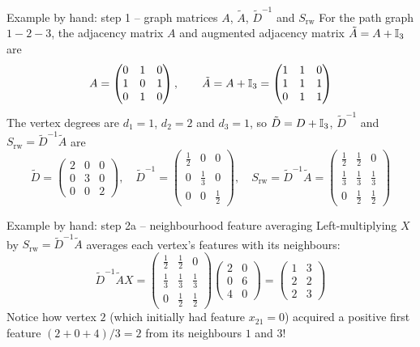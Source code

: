 \documentclass[aspectratio=169]{beamer}\usepackage[]{graphicx}\usepackage[]{xcolor}
\begin{document}
\begin{frame}{Example by hand: step 1 -- graph matrices $A$, $\tilde{A}$, $\tilde{D}^{-1}$ and $S_{\text{rw}}$}
For the path graph $1 - 2 - 3$, the adjacency matrix $A$ and augmented adjacency matrix $\tilde{A} = A + \mathbb{I}_3$ are
\[
A = \begin{pmatrix} 0 & 1 & 0 \\ 1 & 0 & 1 \\ 0 & 1 & 0 \end{pmatrix}, \qquad
\tilde{A} = A + \mathbb{I}_3 = \begin{pmatrix} 1 & 1 & 0 \\ 1 & 1 & 1 \\ 0 & 1 & 1 \end{pmatrix}
\]
\vfill
The vertex degrees are $d_1 = 1$, $d_2 = 2$ and $d_3 = 1$, so $\tilde{D} = D + \mathbb{I}_3$, $\tilde{D}^{-1}$ and $S_{\text{rw}} = \tilde{D}^{-1}\tilde{A}$ are
\[
\tilde{D} = \begin{pmatrix} 2 & 0 & 0 \\ 0 & 3 & 0 \\ 0 & 0 & 2 \end{pmatrix}, \quad
\tilde{D}^{-1} = \begin{pmatrix} \frac{1}{2} & 0 & 0 \\ 0 & \frac{1}{3} & 0 \\ 0 & 0 & \frac{1}{2} \end{pmatrix}, \quad
S_{\text{rw}} = \tilde{D}^{-1}\tilde{A} =
\begin{pmatrix}
\frac{1}{2} & \frac{1}{2} & 0 \\[2pt]
\frac{1}{3} & \frac{1}{3} & \frac{1}{3} \\[2pt]
0 & \frac{1}{2} & \frac{1}{2}
\end{pmatrix}
\]
\end{frame}


\begin{frame}{Example by hand: step 2a -- neighbourhood feature averaging}
Left-multiplying $X$ by $S_{\text{rw}} = \tilde{D}^{-1}\tilde{A}$ averages each vertex's features with its neighbours:
\vfill
\[
\tilde{D}^{-1}\tilde{A} X =
\begin{pmatrix}
\frac{1}{2} & \frac{1}{2} & 0 \\[2pt]
\frac{1}{3} & \frac{1}{3} & \frac{1}{3} \\[2pt]
0 & \frac{1}{2} & \frac{1}{2}
\end{pmatrix}
\begin{pmatrix} 2 & 0 \\ 0 & 6 \\ 4 & 0 \end{pmatrix}
=
\begin{pmatrix} 1 & 3 \\ 2 & 2 \\ 2 & 3 \end{pmatrix}
\]
\vfill
Notice how vertex $2$ (which initially had feature $x_{21} = 0$) acquired a positive first feature $(2+0+4)/3 = 2$ from its neighbours $1$ and $3$!
\end{frame}
\end{document}
